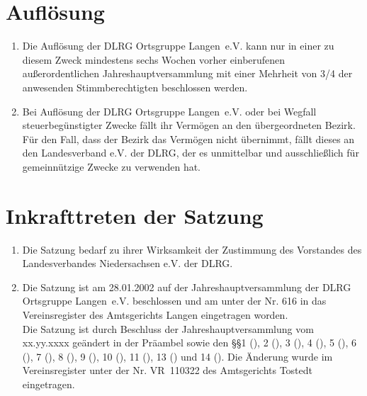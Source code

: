 \documentclass[%
12pt, %
a4paper, %
headsepline, %
footsepline, %
parskip, %
headings=normal, %
]{scrartcl}
\begin{document}
\section{Auflösung}
\label{sec:aufloesung}
\begin{enumerate}
    \item Die Auflösung der DLRG Ortsgruppe Langen~e.V. kann nur in einer zu diesem Zweck mindestens sechs Wochen vorher einberufenen außerordentlichen Jahreshauptversammlung mit einer Mehrheit von \num{3/4} der anwesenden Stimmberechtigten beschlossen werden.
    \item Bei Auflösung der DLRG Ortsgruppe Langen~e.V. oder bei Wegfall steuerbegünstigter Zwecke fällt ihr Vermögen an den übergeordneten Bezirk. Für den Fall, dass der Bezirk das Vermögen nicht übernimmt, fällt dieses an den Landesverband e.V. der DLRG, der es unmittelbar und ausschließlich für gemeinnützige Zwecke zu verwenden hat.
\end{enumerate}

\section{Inkrafttreten der Satzung}
\label{sec:inkrafttreten}
\begin{enumerate}
    \item Die Satzung bedarf zu ihrer Wirksamkeit der Zustimmung des Vorstandes des Landesverbandes Niedersachsen e.V. der DLRG.
    \item Die Satzung ist am 28.01.2002 auf der Jahreshauptversammlung der DLRG Ortsgruppe Langen~e.V. beschlossen und am \hspace{1.5cm} unter der Nr. 616 in das Vereinsregister des Amtsgerichts Langen eingetragen worden.\\
      Die Satzung ist durch Beschluss der Jahreshauptversammlung vom xx.yy.xxxx geändert in der Präambel sowie den \S\S 1 (), 2 (), 3 (), 4 (), 5 (), 6 (), 7 (), 8 (), 9 (), 10 (), 11 (), 13 () und 14 (). Die Änderung wurde im Vereinsregister unter der Nr. VR~110322 des Amtsgerichts Tostedt eingetragen.
\end{enumerate}
\end{document}
